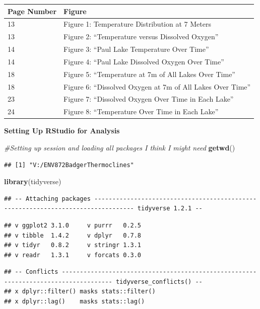 \documentclass[12pt,]{article}
\newenvironment{Shaded}{\begin{snugshade}}{\end{snugshade}}
\newcommand{\KeywordTok}[1]{\textcolor[rgb]{0.13,0.29,0.53}{\textbf{#1}}}
\newcommand{\CommentTok}[1]{\textcolor[rgb]{0.56,0.35,0.01}{\textit{#1}}}
\newcommand{\NormalTok}[1]{#1}
\begin{document}
\newpage

\listoffigures 

\begin{longtable}[]{@{}ll@{}}
\toprule
Page Number & Figure\tabularnewline
\midrule
\endhead
13 & Figure 1: Temperature Distribution at 7 Meters\tabularnewline
13 & Figure 2: ``Temperature versus Dissolved Oxygen''\tabularnewline
14 & Figure 3: ``Paul Lake Temperature Over Time''\tabularnewline
14 & Figure 4: ``Paul Lake Dissolved Oxygen Over Time''\tabularnewline
18 & Figure 5: ``Temperature at 7m of All Lakes Over
Time''\tabularnewline
18 & Figure 6: ``Dissolved Oxygen at 7m of All Lakes Over
Time''\tabularnewline
23 & Figure 7: ``Dissolved Oxygen Over Time in Each
Lake''\tabularnewline
24 & Figure 8: ``Temperature Over Time in Each Lake''\tabularnewline
\bottomrule
\end{longtable}

\newpage

\textbf{Setting Up RStudio for Analysis}

\begin{Shaded}
\begin{Highlighting}[]
\CommentTok{#Setting up session and loading all packages I think I might need}
\KeywordTok{getwd}\NormalTok{()}
\end{Highlighting}
\end{Shaded}

\begin{verbatim}
## [1] "V:/ENV872BadgerThermoclines"
\end{verbatim}

\begin{Shaded}
\begin{Highlighting}[]
\KeywordTok{library}\NormalTok{(tidyverse)}
\end{Highlighting}
\end{Shaded}

\begin{verbatim}
## -- Attaching packages --------------------------------------------------------------------------------- tidyverse 1.2.1 --
\end{verbatim}

\begin{verbatim}
## v ggplot2 3.1.0     v purrr   0.2.5
## v tibble  1.4.2     v dplyr   0.7.8
## v tidyr   0.8.2     v stringr 1.3.1
## v readr   1.3.1     v forcats 0.3.0
\end{verbatim}

\begin{verbatim}
## -- Conflicts ------------------------------------------------------------------------------------ tidyverse_conflicts() --
## x dplyr::filter() masks stats::filter()
## x dplyr::lag()    masks stats::lag()
\end{verbatim}
\end{document}
